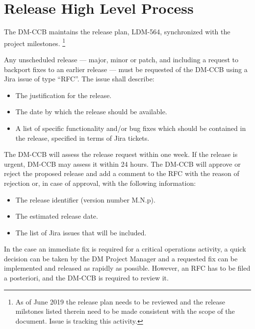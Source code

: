 \section{Release High Level Process} \label{sec:process}

The DM-CCB maintains the release plan, LDM-564, synchronized with the project milestones.
\footnote{As of June 2019 the release plan needs to be reviewed and the release milstones listed therein need to be made consistent with the scope of the document.
Issue  is tracking this activity.}

Any unscheduled release --- major, minor or patch, and including a request to backport fixes to an earlier release --- must be requested of the DM-CCB using a Jira issue of type ``RFC''.
The issue shall describe:

\begin{itemize}
\item The justification for the release.
\item The date by which the release should be available.
\item A list of specific functionality and/or bug fixes which should be contained in the release, specified in terms of Jira tickets.
\end{itemize}

The DM-CCB will assess the release request within one week.
If the release is urgent, DM-CCB may assess it within 24 hours.
The DM-CCB will approve or reject the proposed release and add a comment to the RFC with the reason of rejection or, in case of approval, with the following information:

\begin{itemize}
\item The release identifier (version number M.N.p).
\item The estimated release date.
\item The list of Jira issues that will be included.
\end{itemize}

In the case an immediate fix is required for a critical operations activity, a quick decision can be taken by the DM Project Manager and a requested fix can be implemented and released as rapidly as possible.
However, an \gls{RFC} has to be filed a posteriori, and the DM-CCB is required to review it.
